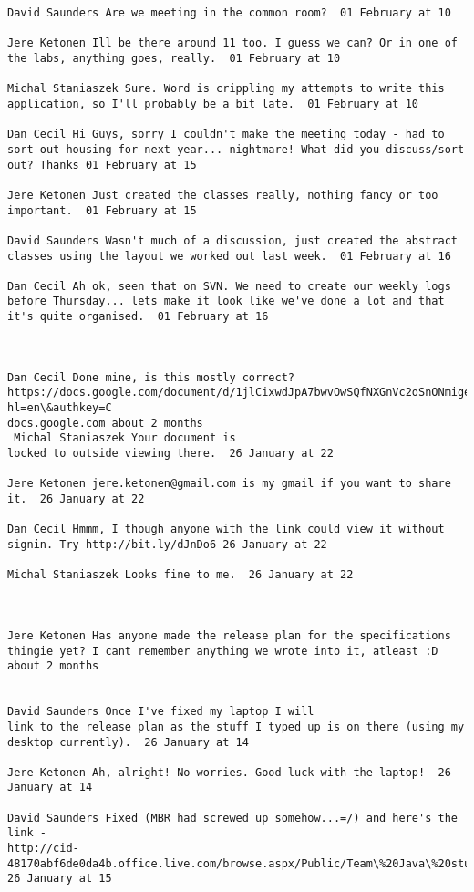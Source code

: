 \documentclass[10pt]{report}
\begin{document}
\begin{verbatim}
David Saunders Are we meeting in the common room?  01 February at 10

Jere Ketonen Ill be there around 11 too. I guess we can? Or in one of
the labs, anything goes, really.  01 February at 10

Michal Staniaszek Sure. Word is crippling my attempts to write this
application, so I'll probably be a bit late.  01 February at 10

Dan Cecil Hi Guys, sorry I couldn't make the meeting today - had to
sort out housing for next year... nightmare! What did you discuss/sort
out? Thanks 01 February at 15

Jere Ketonen Just created the classes really, nothing fancy or too
important.  01 February at 15

David Saunders Wasn't much of a discussion, just created the abstract
classes using the layout we worked out last week.  01 February at 16

Dan Cecil Ah ok, seen that on SVN. We need to create our weekly logs
before Thursday... lets make it look like we've done a lot and that
it's quite organised.  01 February at 16



Dan Cecil Done mine, is this mostly correct?
https://docs.google.com/document/d/1jlCixwdJpA7bwvOwSQfNXGnVc2oSnONmigeV3pKJ6VY/edit?hl=en\&authkey=C
docs.google.com about 2 months 
 Michal Staniaszek Your document is
locked to outside viewing there.  26 January at 22

Jere Ketonen jere.ketonen@gmail.com is my gmail if you want to share
it.  26 January at 22

Dan Cecil Hmmm, I though anyone with the link could view it without
signin. Try http://bit.ly/dJnDo6 26 January at 22

Michal Staniaszek Looks fine to me.  26 January at 22



Jere Ketonen Has anyone made the release plan for the specifications
thingie yet? I cant remember anything we wrote into it, atleast :D
about 2 months 
 

David Saunders Once I've fixed my laptop I will
link to the release plan as the stuff I typed up is on there (using my
desktop currently).  26 January at 14

Jere Ketonen Ah, alright! No worries. Good luck with the laptop!  26
January at 14

David Saunders Fixed (MBR had screwed up somehow...=/) and here's the
link -
http://cid-48170abf6de0da4b.office.live.com/browse.aspx/Public/Team\%20Java\%20stuffs
26 January at 15


\end{verbatim}
\end{document}
